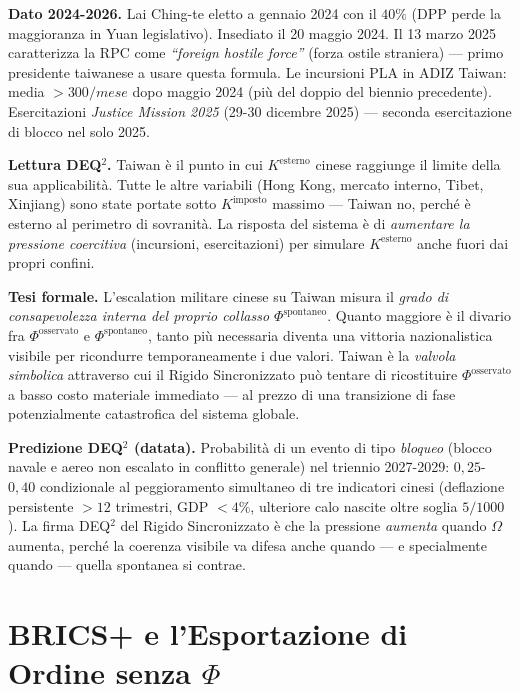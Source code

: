 \Proved{} \textbf{Dato 2024-2026.} Lai Ching-te eletto a gennaio 2024
con il \(40\%\) (DPP perde la maggioranza in Yuan legislativo).
Insediato il 20 maggio 2024. Il 13 marzo 2025 caratterizza la RPC come
\emph{``foreign hostile force''} (forza ostile straniera) --- primo
presidente taiwanese a usare questa formula. Le incursioni PLA in ADIZ
Taiwan: media \(> 300/mese\) dopo maggio 2024 (più del doppio del
biennio precedente). Esercitazioni \emph{Justice Mission 2025} (29-30
dicembre 2025) --- seconda esercitazione di blocco nel solo 2025.

\Hypoth{} \textbf{Lettura DEQ$^2$.} Taiwan è il punto in cui
\(K^{\text{esterno}}\) cinese raggiunge il limite della sua
applicabilità. Tutte le altre variabili (Hong Kong, mercato interno,
Tibet, Xinjiang) sono state portate sotto \(K^{\text{imposto}}\) massimo
--- Taiwan no, perché è esterno al perimetro di sovranità. La risposta
del sistema è di \emph{aumentare la pressione coercitiva} (incursioni,
esercitazioni) per simulare \(K^{\text{esterno}}\) anche fuori dai
propri confini.

\Hypoth{} \textbf{Tesi formale.} L'escalation militare cinese su Taiwan
misura il \emph{grado di consapevolezza interna del proprio collasso
\(\Phi^{\text{spontaneo}}\)}. Quanto maggiore è il divario fra
\(\Phi^{\text{osservato}}\) e \(\Phi^{\text{spontaneo}}\), tanto più
necessaria diventa una vittoria nazionalistica visibile per ricondurre
temporaneamente i due valori. Taiwan è la \emph{valvola simbolica}
attraverso cui il Rigido Sincronizzato può tentare di ricostituire
\(\Phi^{\text{osservato}}\) a basso costo materiale immediato --- al
prezzo di una transizione di fase potenzialmente catastrofica del
sistema globale.

\Conj{} \textbf{Predizione DEQ$^2$ (datata).} Probabilità di un evento di
tipo \emph{bloqueo} (blocco navale e aereo non escalato in conflitto
generale) nel triennio 2027-2029: \(0{,}25\)-\(0{,}40\) condizionale al
peggioramento simultaneo di tre indicatori cinesi (deflazione
persistente \(> 12\) trimestri, GDP \(< 4\%\), ulteriore calo nascite
oltre soglia \(5/1000\)). La firma DEQ$^2$ del Rigido Sincronizzato è che
la pressione \emph{aumenta} quando \(\Omega\) aumenta, perché la
coerenza visibile va difesa anche quando --- e specialmente quando ---
quella spontanea si contrae.



\section{\texorpdfstring{BRICS+ e l'Esportazione di Ordine senza
\(\Phi\)}{BRICS+ e l'Esportazione di Ordine senza \textbackslash Phi}}\label{brics-e-lesportazione-di-ordine-senza-phi}

